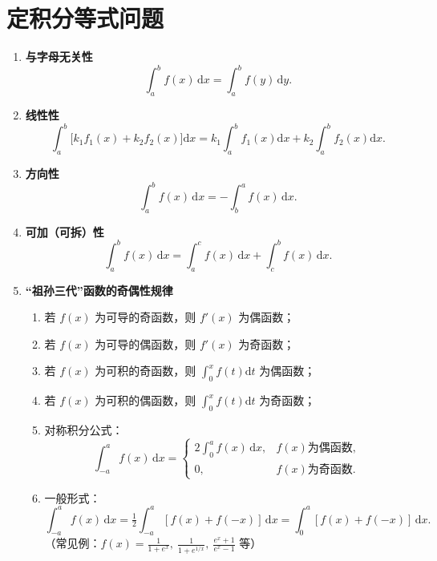 
\section{定积分等式问题}

\begin{enumerate}
    \item \textbf{与字母无关性}
          $$
              \int_{a}^{b} f(x)\,\mathrm{d}x = \int_{a}^{b} f(y)\,\mathrm{d}y.
          $$

    \item \textbf{线性性}
          $$
              \int_{a}^{b}\!\!\big[k_1f_1(x)+k_2f_2(x)\big]\mathrm{d}x
              =k_1\!\int_{a}^{b}\!f_1(x)\mathrm{d}x+k_2\!\int_{a}^{b}\!f_2(x)\mathrm{d}x.
          $$

    \item \textbf{方向性}
          $$
              \int_{a}^{b}f(x)\,\mathrm{d}x=-\int_{b}^{a}f(x)\,\mathrm{d}x.
          $$

    \item \textbf{可加（可拆）性}
          $$
              \int_{a}^{b}f(x)\,\mathrm{d}x=\int_{a}^{c}f(x)\,\mathrm{d}x+\int_{c}^{b}f(x)\,\mathrm{d}x.
          $$

    \item \textbf{“祖孙三代”函数的奇偶性规律}
          \begin{enumerate}
              \item 若 $f(x)$ 为可导的奇函数，则 $f'(x)$ 为偶函数；
              \item 若 $f(x)$ 为可导的偶函数，则 $f'(x)$ 为奇函数；
              \item 若 $f(x)$ 为可积的奇函数，则 $\displaystyle \int_{0}^{x}f(t)\mathrm{d}t$ 为偶函数；
              \item 若 $f(x)$ 为可积的偶函数，则 $\displaystyle \int_{0}^{x}f(t)\mathrm{d}t$ 为奇函数；
              \item 对称积分公式：
                    $$
                        \int_{-a}^{a}f(x)\,\mathrm{d}x=
                        \begin{cases}
                            2\int_{0}^{a}f(x)\,\mathrm{d}x, & f(x)\text{为偶函数}, \\[4pt]
                            0,                              & f(x)\text{为奇函数}.
                        \end{cases}
                    $$
              \item 一般形式：
                    $$
                        \int_{-a}^{a}f(x)\,\mathrm{d}x
                        =\tfrac{1}{2}\!\int_{-a}^{a}[f(x)+f(-x)]\,\mathrm{d}x
                        =\!\int_{0}^{a}[f(x)+f(-x)]\,\mathrm{d}x.
                    $$
                    （常见例：$f(x)=\tfrac{1}{1+e^{x}},\ \tfrac{1}{1+e^{1/x}},\ \tfrac{e^x+1}{e^x-1}$ 等）
          \end{enumerate}


\end{enumerate}
